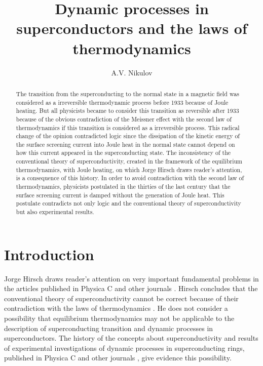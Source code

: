 \documentclass[twocolumn,secnumarabic,amssymb, nobibnotes, aps, prd]{revtex4}
\begin{document}
\title{Dynamic processes in superconductors and the laws of thermodynamics }

\author{A.V. Nikulov}

\begin{abstract} The transition from the superconducting to the normal state in a magnetic field was considered as a irreversible thermodynamic process before 1933 because of Joule heating. But all physicists became to consider this transition as reversible after 1933 because of the obvious contradiction of the Meissner effect with the second law of thermodynamics if this transition is considered as a irreversible process. This radical change of the opinion contradicted logic since the dissipation of the kinetic energy of the surface screening current into Joule heat in the normal state cannot depend on how this current appeared in the superconducting state. The inconsistency of the conventional theory of superconductivity, created in the framework of the equilibrium thermodynamics, with Joule heating, on which Jorge Hirsch draws reader's attention, is a consequence of this history. In order to avoid contradiction with the second law of thermodynamics, physicists postulated in the thirties of the last century that the surface screening current is damped without the generation of Joule heat. This postulate contradicts not only logic and the conventional theory of superconductivity but also experimental results.  
 \end{abstract}

\maketitle

\narrowtext

\section{Introduction}
\label{}
Jorge Hirsch draws reader's attention on very important fundamental problems in the articles published in Physica C \cite{Hirsch2020Physica} and other journals  \cite{Hirsch2020EPL,Hirsch2020ModPhys,Hirsch2020APS}. Hirsch concludes that the conventional theory of superconductivity cannot be correct \cite{Hirsch2020APS} because of their contradiction with the laws of thermodynamics \cite{Hirsch2020Physica,Hirsch2020EPL,Hirsch2020ModPhys}. He does not consider a possibility that equilibrium thermodynamics may not be applicable to the description of superconducting transition and dynamic processes in superconductors. The history of the concepts about superconductivity and results of experimental investigations of dynamic processes in superconducting rings, published in Physica C \cite{Physica2019} and other journals \cite{PLA2012Ex,Letter2007,JETP2007,Letter2003}, give evidence this possibility. 
\end{document}
